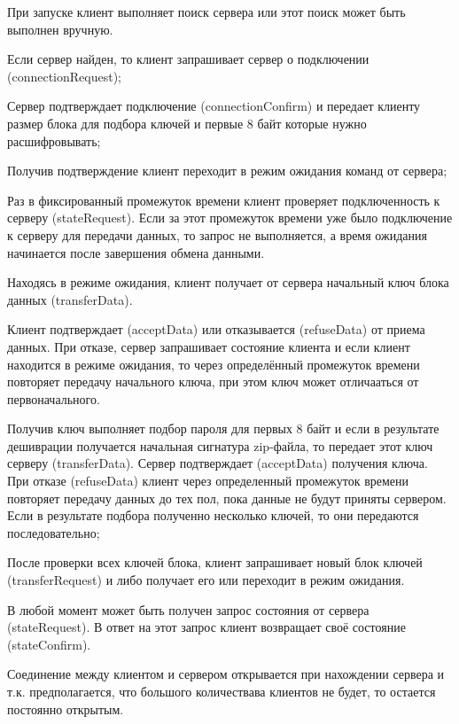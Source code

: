 
\begin{DoxyItemize}
\item При запуске клиент выполняет поиск сервера или этот поиск может быть выполнен вручную.
\item Если сервер найден, то клиент запрашивает сервер о подключении (connection\+Request);
\item Сервер подтверждает подключение (connection\+Confirm) и передает клиенту размер блока для подбора ключей и первые 8 байт которые нужно расшифровывать;
\item Получив подтверждение клиент переходит в режим ожидания команд от сервера;
\item Раз в фиксированный промежуток времени клиент проверяет подключенность к серверу (state\+Request). Если за этот промежуток времени уже было подключение к серверу для передачи данных, то запрос не выполняется, а время ожидания начинается после завершения обмена данными.
\item Находясь в режиме ожидания, клиент получает от сервера начальный ключ блока данных (transfer\+Data).
\item Клиент подтверждает (accept\+Data) или отказывается (refuse\+Data) от приема данных. При отказе, сервер запрашивает состояние клиента и если клиент находится в режиме ожидания, то через определённый промежуток времени повторяет передачу начального ключа, при этом ключ может отличааться от первоначального.
\item Получив ключ выполняет подбор пароля для первых 8 байт и если в результате дешиврации получается начальная сигнатура zip-\/файла, то передает этот ключ серверу (transfer\+Data). Сервер подтверждает (accept\+Data) получения ключа. При отказе (refuse\+Data) клиент через определенный промежуток времени повторяет передачу данных до тех пол, пока данные не будут приняты сервером. Если в результате подбора полученно несколько ключей, то они передаются последовательно;
\item После проверки всех ключей блока, клиент запрашивает новый блок ключей (transfer\+Request) и либо получает его или переходит в режим ожидания.
\item В любой момент может быть получен запрос состояния от сервера (state\+Request). В ответ на этот запрос клиент возвращает своё состояние (state\+Confirm).
\item Соединение между клиентом и сервером открывается при нахождении сервера и т.\+к. предполагается, что большого количествава клиентов не будет, то остается постоянно открытым. 
\end{DoxyItemize}